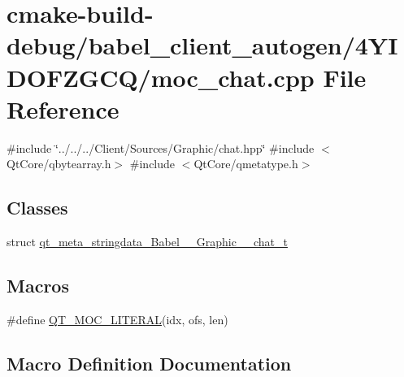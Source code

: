 \hypertarget{cmake-build-debug_2babel__client__autogen_24YIDOFZGCQ_2moc__chat_8cpp}{}\section{cmake-\/build-\/debug/babel\+\_\+client\+\_\+autogen/4\+Y\+I\+D\+O\+F\+Z\+G\+C\+Q/moc\+\_\+chat.cpp File Reference}
\label{cmake-build-debug_2babel__client__autogen_24YIDOFZGCQ_2moc__chat_8cpp}
{\ttfamily \#include \char`\"{}../../../\+Client/\+Sources/\+Graphic/chat.\+hpp\char`\"{}}\newline
{\ttfamily \#include $<$Qt\+Core/qbytearray.\+h$>$}\newline
{\ttfamily \#include $<$Qt\+Core/qmetatype.\+h$>$}\newline
\subsection*{Classes}
\begin{DoxyCompactItemize}
\item 
struct \hyperlink{structqt__meta__stringdata__Babel____Graphic____chat__t}{qt\+\_\+meta\+\_\+stringdata\+\_\+\+Babel\+\_\+\+\_\+\+Graphic\+\_\+\+\_\+chat\+\_\+t}
\end{DoxyCompactItemize}
\subsection*{Macros}
\begin{DoxyCompactItemize}
\item 
\#define \hyperlink{cmake-build-debug_2babel__client__autogen_24YIDOFZGCQ_2moc__chat_8cpp_a75bb9482d242cde0a06c9dbdc6b83abe}{Q\+T\+\_\+\+M\+O\+C\+\_\+\+L\+I\+T\+E\+R\+AL}(idx,  ofs,  len)
\end{DoxyCompactItemize}


\subsection{Macro Definition Documentation}
\mbox{\label{cmake-build-debug_2babel__client__autogen_24YIDOFZGCQ_2moc__chat_8cpp_a75bb9482d242cde0a06c9dbdc6b83abe}} 
